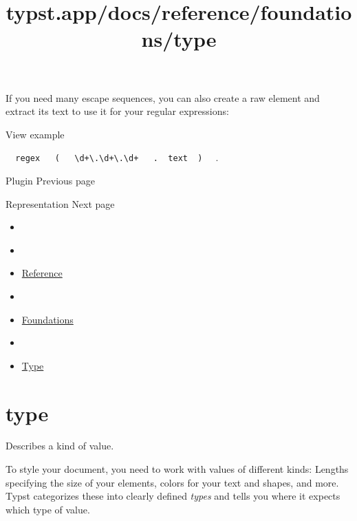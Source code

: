 If you need many escape sequences, you can also create a raw element and
extract its text to use it for your regular expressions:


View example

\texttt{\ }{\texttt{\ regex\ }}\texttt{\ }{\texttt{\ (\ }}\texttt{\ }{\texttt{\ \textasciigrave{}\textbackslash{}d+\textbackslash{}.\textbackslash{}d+\textbackslash{}.\textbackslash{}d+\textasciigrave{}\ }}\texttt{\ }{\texttt{\ .\ }}\texttt{\ text\ }{\texttt{\ )\ }}\texttt{\ }
.

\href{/docs/reference/foundations/plugin/}{\pandocbounded{}}

{ Plugin } { Previous page }

\href{/docs/reference/foundations/repr/}{\pandocbounded{}}

{ Representation } { Next page }


\title{typst.app/docs/reference/foundations/type}

\begin{itemize}
\tightlist
\item
  \href{/docs}{}
\item
  
\item
  \href{/docs/reference/}{Reference}
\item
  
\item
  \href{/docs/reference/foundations/}{Foundations}
\item
  
\item
  \href{/docs/reference/foundations/type/}{Type}
\end{itemize}

\section{\texorpdfstring{{ type }}{ type }}\label{summary}

Describes a kind of value.

To style your document, you need to work with values of different kinds:
Lengths specifying the size of your elements, colors for your text and
shapes, and more. Typst categorizes these into clearly defined
\emph{types} and tells you where it expects which type of value.

